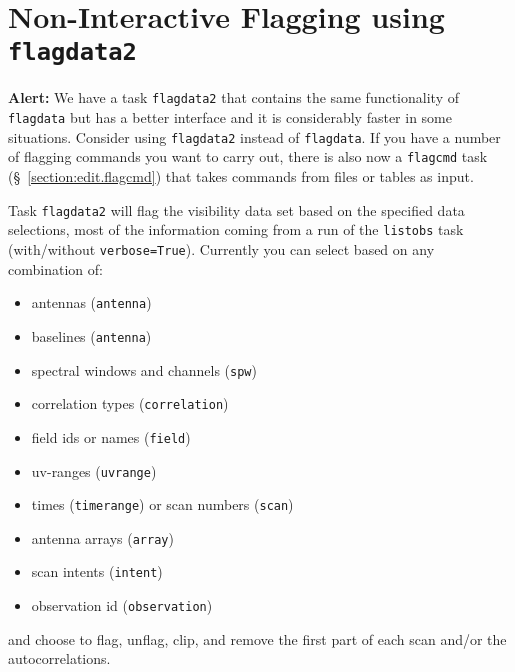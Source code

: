 \section{Non-Interactive Flagging using {\tt flagdata2}}
\label{section:edit.flagdata}

{\bf Alert:} We have a task {\tt flagdata2} that contains the same
functionality of {\tt flagdata} but has a better interface and it is
considerably faster in some situations. Consider using {\tt flagdata2}
instead of {\tt flagdata}.  If you have a number of flagging commands
you want to carry out, there is also now a {\tt flagcmd} task
(\S~\ref{section:edit.flagcmd}) that takes commands from files or
tables as input.

Task {\tt flagdata2} will flag the visibility data set based on the
specified data selections, most of the information coming from a run
of the {\tt listobs} task (with/without {\tt verbose=True}). Currently you can
select based on any combination of: 

\begin{itemize}
   \item antennas ({\tt antenna})
   \item baselines ({\tt antenna})
   \item spectral windows and channels ({\tt spw})
   \item correlation types ({\tt correlation})
   \item field ids or names ({\tt field})
   \item uv-ranges ({\tt uvrange})
   \item times ({\tt timerange}) or scan numbers ({\tt scan})
   \item antenna arrays ({\tt array})
   \item scan intents ({\tt intent})
   \item observation id ({\tt observation})
\end{itemize}

and choose to flag, unflag, clip, and
remove the first part of each scan and/or the 
autocorrelations.

